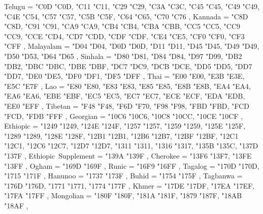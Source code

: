 {    Telugu                                         = { {"C0D} {"C0D}, {"C11} {"C11}, {"C29} {"C29}, {"C3A} {"C3C}, {"C45} {"C45}, {"C49} {"C49}, {"C4E} {"C54}, {"C57} {"C57}, {"C5B} {"C5F}, {"C64} {"C65}, {"C70} {"C76} },
    Kannada                                        = { {"C8D} {"C8D}, {"C91} {"C91}, {"CA9} {"CA9}, {"CB4} {"CB4}, {"CBA} {"CBB}, {"CC5} {"CC5}, {"CC9} {"CC9}, {"CCE} {"CD4}, {"CD7} {"CDD}, {"CDF} {"CDF}, {"CE4} {"CE5}, {"CF0} {"CF0}, {"CF3} {"CFF} },
    Malayalam                                      = { {"D04} {"D04}, {"D0D} {"D0D}, {"D11} {"D11}, {"D45} {"D45}, {"D49} {"D49}, {"D50} {"D53}, {"D64} {"D65} },
    Sinhala                                        = { {"D80} {"D81}, {"D84} {"D84}, {"D97} {"D99}, {"DB2} {"DB2}, {"DBC} {"DBC}, {"DBE} {"DBF}, {"DC7} {"DC9}, {"DCB} {"DCE}, {"DD5} {"DD5}, {"DD7} {"DD7}, {"DE0} {"DE5}, {"DF0} {"DF1}, {"DF5} {"DFF} },
    Thai                                           = { {"E00} {"E00}, {"E3B} {"E3E}, {"E5C} {"E7F} },
    Lao                                            = { {"E80} {"E80}, {"E83} {"E83}, {"E85} {"E85}, {"E8B} {"E8B}, {"EA4} {"EA4}, {"EA6} {"EA6}, {"EBE} {"EBF}, {"EC5} {"EC5}, {"EC7} {"EC7}, {"ECE} {"ECF}, {"EDA} {"EDB}, {"EE0} {"EFF} },
    Tibetan                                        = { {"F48} {"F48}, {"F6D} {"F70}, {"F98} {"F98}, {"FBD} {"FBD}, {"FCD} {"FCD}, {"FDB} {"FFF} },
    Georgian                                       = { {"10C6} {"10C6}, {"10C8} {"10CC}, {"10CE} {"10CF} },
    Ethiopic                                       = { {"1249} {"1249}, {"124E} {"124F}, {"1257} {"1257}, {"1259} {"1259}, {"125E} {"125F}, {"1289} {"1289}, {"128E} {"128F}, {"12B1} {"12B1}, {"12B6} {"12B7}, {"12BF} {"12BF}, {"12C1} {"12C1}, {"12C6} {"12C7}, {"12D7} {"12D7}, {"1311} {"1311}, {"1316} {"1317}, {"135B} {"135C}, {"137D} {"137F} },
    Ethiopic~Supplement                            = { {"139A} {"139F} },
    Cherokee                                       = { {"13F6} {"13F7}, {"13FE} {"13FF} },
    Ogham                                          = { {"169D} {"169F} },
    Runic                                          = { {"16F9} {"16FF} },
    Tagalog                                        = { {"170D} {"170D}, {"1715} {"171F} },
    Hanunoo                                        = { {"1737} {"173F} },
    Buhid                                          = { {"1754} {"175F} },
    Tagbanwa                                       = { {"176D} {"176D}, {"1771} {"1771}, {"1774} {"177F} },
    Khmer                                          = { {"17DE} {"17DF}, {"17EA} {"17EF}, {"17FA} {"17FF} },
    Mongolian                                      = { {"180F} {"180F}, {"181A} {"181F}, {"1879} {"187F}, {"18AB} {"18AF} },
}
